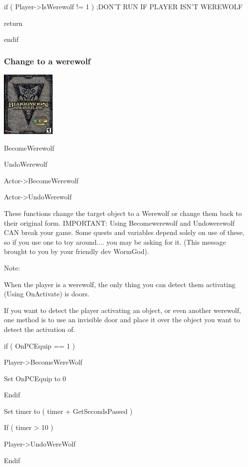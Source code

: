 \documentclass[
]{article}
\begin{document}
if ( Player-\textgreater IsWerewolf != 1 ) ;DON'T RUN IF PLAYER ISN'T
WEREWOLF

return

endif

\hypertarget{change-to-a-werewolf}{%
\subsubsection{Change to a werewolf}\label{change-to-a-werewolf}}

\includegraphics{media/image7.png}

BecomeWerewolf

UndoWerewolf

Actor-\textgreater BecomeWerewolf

Actor-\textgreater UndoWerewolf

These functions change the target object to a Werewolf or change them
back to their original form. IMPORTANT: Using Becomewerewolf and
Undowerewolf CAN break your game. Some quests and variables depend
solely on use of these, so if you use one to toy around.... you may be
asking for it. (This message brought to you by your friendly dev
WormGod).

Note:

When the player is a werewolf, the only thing you can detect them
activating (Using OnActivate) is doors.

If you want to detect the player activating an object, or even another
werewolf, one method is to use an invisible door and place it over the
object you want to detect the activation of.

if ( OnPCEquip == 1 )

Player-\textgreater BecomeWereWolf

Set OnPCEquip to 0

Endif

Set timer to ( timer + GetSecondsPassed )

If ( timer \textgreater{} 10 )

Player-\textgreater UndoWereWolf

Endif

\hypertarget{section-8}{%
\subsubsection{}\label{section-8}}
\end{document}
